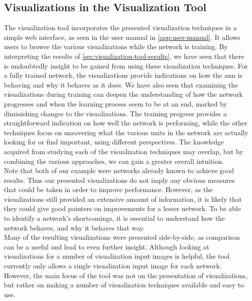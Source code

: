 \subsection{Visualizations in the Visualization Tool}

The visualization tool incorporates the presented visualization techniques in a simple web interface, as seen in the user manual in \autoref{app:user-manual}. It allows users to browse the various visualizations while the network is training. By interpreting the results of \autoref{sec:visualization-tool-results}, we have seen that there is undoubtedly insight to be gained from using these visualization techniques. For a fully trained network, the visualizations provide indications on how the \acrshort{ann} is behaving and why it behaves as it does. We have also seen that examining the visualizations during training can deepen the understanding of how the network progresses and when the learning process seem to be at an end, marked by diminishing changes to the visualizations. The training progress provides a straightforward indication on how well the network is performing, while the other techniques focus on uncovering what the various units in the network are actually looking for or find important, using different perspectives. The knowledge acquired from studying each of the visualization techniques may overlap, but by combining the various approaches, we can gain a greater overall intuition. \\

\noindent Note that both of our example  were networks already known to achieve good results. Thus our presented visualizations do not imply any obvious measures that could be taken in order to improve performance. However, as the visualizations still provided an extensive amount of information, it is likely that they could give good pointers on improvements for a lesser network. To be able to identify a network's shortcomings, it is essential to understand how the network behaves, and why it behaves that way. \\

\noindent Many of the resulting visualizations were presented side-by-side, as comparison can be a useful and lead to even further insight. Although looking at visualizations for a number of visualization input images is helpful, the tool currently only allows a single visualization input image for each network. However, the main focus of the tool was not on the presentation of visualizations, but rather on making a number of visualization techniques available and easy to use. \\

